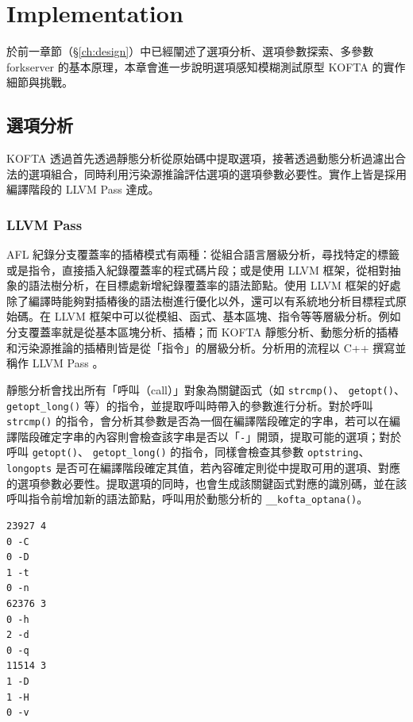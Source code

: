 \chapter{Implementation}
\label{ch:implementation}

於前一章節（\S \ref{ch:design}）中已經闡述了選項分析、選項參數探索、多參數 forkserver 的基本原理，本章會進一步說明選項感知模糊測試原型 KOFTA 的實作細節與挑戰。

\section{選項分析}

KOFTA 透過首先透過靜態分析從原始碼中提取選項，接著透過動態分析過濾出合法的選項組合，同時利用污染源推論評估選項的選項參數必要性。實作上皆是採用編譯階段的 LLVM Pass 達成。

\subsection{LLVM Pass}
\label{subsec:llvm-pass}

AFL 紀錄分支覆蓋率的插樁模式有兩種：從組合語言層級分析，尋找特定的標籤或是指令，直接插入紀錄覆蓋率的程式碼片段；或是使用 LLVM 框架，從相對抽象的語法樹分析，在目標處新增紀錄覆蓋率的語法節點。使用 LLVM 框架的好處除了編譯時能夠對插樁後的語法樹進行優化以外，還可以有系統地分析目標程式原始碼。在 LLVM 框架中可以從模組、函式、基本區塊、指令等等層級分析。例如分支覆蓋率就是從基本區塊分析、插樁；而 KOFTA 靜態分析、動態分析的插樁和污染源推論的插樁則皆是從「指令」的層級分析。分析用的流程以 C++ 撰寫並稱作 LLVM Pass 。

靜態分析會找出所有「呼叫（call）」對象為關鍵函式（如 \texttt{strcmp()}、 \texttt{getopt()}、 \texttt{getopt\_long()} 等）的指令，並提取呼叫時帶入的參數進行分析。對於呼叫 \texttt{strcmp()} 的指令，會分析其參數是否為一個在編譯階段確定的字串，若可以在編譯階段確定字串的內容則會檢查該字串是否以「\texttt{-}」開頭，提取可能的選項；對於呼叫 \texttt{getopt()}、 \texttt{getopt\_long()} 的指令，同樣會檢查其參數 \texttt{optstring}、\texttt{longopts} 是否可在編譯階段確定其值，若內容確定則從中提取可用的選項、對應的選項參數必要性。提取選項的同時，也會生成該關鍵函式對應的識別碼，並在該呼叫指令前增加新的語法節點，呼叫用於動態分析的 \texttt{\_\_kofta\_optana()}。

\begin{lstlisting}[language=TeX, caption=選項文件範例, label=lst:opttxt-example]
23927 4
0 -C
0 -D
1 -t
0 -n
62376 3
0 -h
2 -d
0 -q
11514 3
1 -D
1 -H
0 -v
\end{lstlisting}

